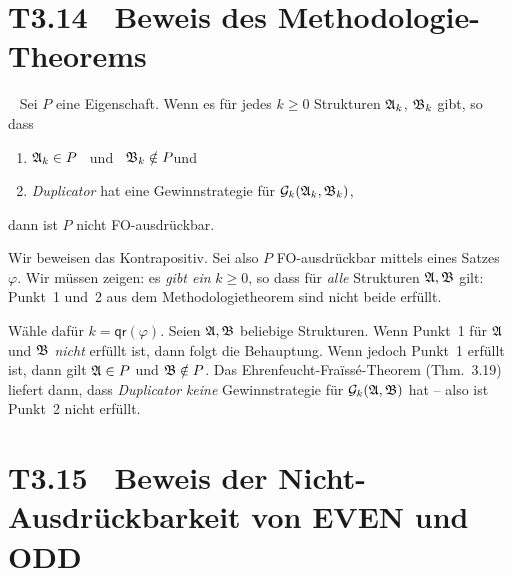 \documentclass[fontsize=11pt, twoside=false, numbers=autoenddot]{scrbook}
\begin{document}
\goodbreak
\section*{T3.14~ Beweis des Methodologie-Theorems}

~ %
Sei $P$ eine Eigenschaft. Wenn es f\"ur jedes $k \geq 0$ Strukturen $\mathfrak{A}_k$, $\mathfrak{B}_k$
gibt, so dass
%
\begin{enumerate}
  \item
    $\mathfrak{A}_k \in P$ ~und~ $\mathfrak{B}_k \notin P$\qquad und
  \item \emph{Duplicator} hat eine Gewinnstrategie f\"ur $\mathcal{G}_k(\mathfrak{A}_k,\mathfrak{B}_k)$,
\end{enumerate}
%
dann ist $P$ nicht FO-ausdr\"uckbar.
%
\begin{beweis}
  Wir beweisen das Kontrapositiv.
  Sei also $P$ FO-ausdrückbar mittels eines Satzes $\varphi$.
  Wir müssen zeigen: es \emph{gibt ein} $k \geq 0$, so dass für \emph{alle} Strukturen $\mathfrak{A},\mathfrak{B}$ gilt:
  Punkt~1 und~2 aus dem Methodologietheorem sind nicht beide erfüllt.

  Wähle dafür $k = \textsf{qr}(\varphi)$.
  Seien $\mathfrak{A},\mathfrak{B}$ beliebige Strukturen.
  Wenn Punkt~1 für $\mathfrak{A}$ und $\mathfrak{B}$ \emph{nicht} erfüllt ist, dann folgt die Behauptung.
  Wenn jedoch Punkt~1 erfüllt ist, dann gilt
  $\mathfrak{A} \in P$ und $\mathfrak{B} \notin P$.
  Das Ehrenfeucht-Fraïssé-Theorem (Thm.~3.19)
  liefert dann, dass \emph{Duplicator} \emph{keine} Gewinnstrategie 
  für $\mathcal{G}_k(\mathfrak{A},\mathfrak{B})$ hat -- also ist Punkt~2 nicht erfüllt.
  \qedhere
\end{beweis}%

\section*{T3.15~ Beweis der Nicht-Ausdrückbarkeit von EVEN und ODD}
\end{document}
